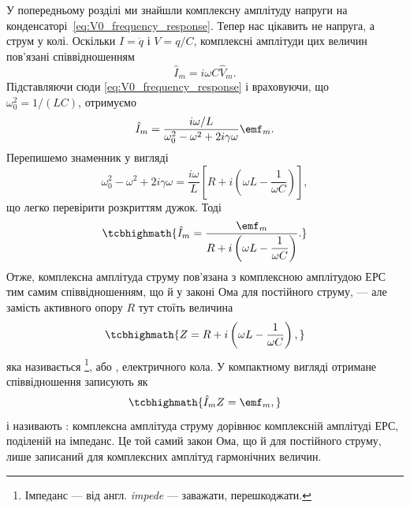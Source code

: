 У попередньому розділі ми знайшли комплексну амплітуду напруги на конденсаторі~\eqref{eq:V0_frequency_response}. Тепер нас цікавить не напруга, а струм у колі. Оскільки $I = \dot{q}$ і $V = q/C$, комплексні амплітуди цих величин пов'язані співвідношенням
\begin{equation}\label{eq:I_from_V}
	\hat{I}_m = i\omega C \hat{V}_m.
\end{equation}
Підставляючи сюди \eqref{eq:V0_frequency_response} і враховуючи, що $\omega_0^2 = 1/(LC)$, отримуємо
\begin{equation}\label{eq:I0_explicit}
	\hat{I}_m = \frac{i\omega / L}{\omega_0^2 - \omega^2 + 2i\gamma\omega}\emf_m.
\end{equation}
Перепишемо знаменник у вигляді
\begin{equation}\label{eq:denominator_impedance}
	\omega_0^2 - \omega^2 + 2i\gamma\omega = \frac{i\omega}{L}\left[R + i\left(\omega L - \frac{1}{\omega C}\right)\right],
\end{equation}
що легко перевірити розкриттям дужок. Тоді
\begin{equation}\label{eq:Ohm_complex_derived}
	\tcbhighmath{
		\hat{I}_m = \frac{\emf_m}{R + i\left(\omega L - \dfrac{1}{\omega C}\right)}.
	}
\end{equation}
Отже, комплексна амплітуда струму пов'язана з комплексною амплітудою ЕРС тим самим співвідношенням, що й у законі Ома для постійного струму, --- але замість активного опору $R$ тут стоїть величина
\begin{equation}\label{eq:impedance}
	\tcbhighmath{
		Z = R + i\left(\omega L - \frac{1}{\omega C}\right),
	}
\end{equation}
яка називається \footnote{Імпеданс --- від англ. \emph{impede} --- заважати, перешкоджати.}, або , електричного кола. У компактному вигляді отримане співвідношення записують як
\begin{equation}\label{eq:Ohm_complex}
	\tcbhighmath{
		\hat{I}_m Z = \emf_m,
	}
\end{equation}
і називають : комплексна амплітуда струму дорівнює комплексній амплітуді ЕРС, поділеній на імпеданс. Це той самий закон Ома, що й для постійного струму, лише записаний для комплексних амплітуд гармонічних величин.

